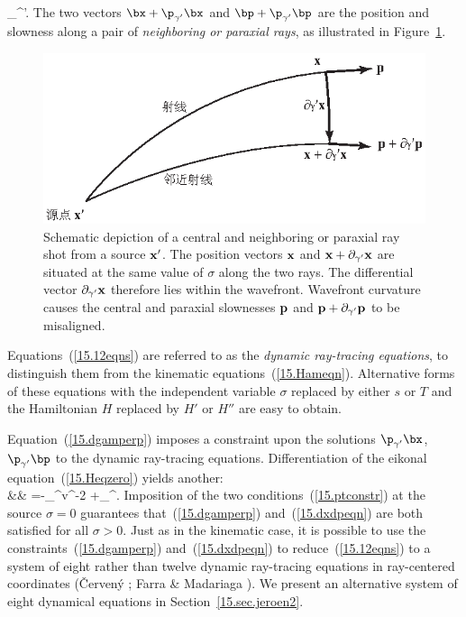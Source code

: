 \cdot\p_{\gamma^{\prime}}\bp'.
\en
The two vectors $\bx+\p_{\gamma^{\prime}}\bx$ and $\bp+\p_{\gamma^{\prime}}\bp$
are the position and slowness along a pair of {\em neighboring or paraxial
rays\/},
%
%
as illustrated in Figure~\ref{15.fig.neighbor}.
\begin{figure}
\begin{center}
\includegraphics{../figures/chap15/fig02.eps}
\end{center}
\caption[paraxial ray]
{\label{15.fig.neighbor}
Schematic depiction of a central and neighboring or paraxial ray
shot from a source ${\bf x}'$.  The position vectors ${\bf x}$
and ${\bf x}+\partial_{\gamma'}{\bf x}$ are situated at the
same value of $\sigma$ along the two rays.  The differential
vector $\partial_{\gamma'}{\bf x}$ therefore lies within the
wavefront.  Wavefront curvature causes the central and paraxial
slownesses ${\bf p}$ and ${\bf p}+\partial_{\gamma'}{\bf p}$ to
be misaligned.}
\end{figure}
Equations~(\ref{15.12eqns}) are referred to as the
{\em dynamic ray-tracing equations\/}, to distinguish
%
them from the kinematic equations~(\ref{15.Hameqn}).
Alternative forms of these equations with the
independent variable $\sigma$ replaced by either $s$ or $T$ and the
Hamiltonian $H$ replaced by $H'$ or $H''$ are easy to obtain.

Equation~(\ref{15.dgamperp}) imposes a constraint upon the solutions
$\p_{\gamma^{\prime}}\bx$, $\p_{\gamma^{\prime}}\bp$ to the dynamic
ray-tracing equations.  Differentiation of the eikonal
equation~(\ref{15.Heqzero}) yields another:
\eqa \label{15.dxdpeqn}  \nonumber \\
&&\mbox{}\hspace{1.0 mm}
=-\half\p_{\gamma^{\prime}}\bx\cdot\bdel v^{-2}
+\p_{\gamma^{\prime}}\bp\cdot{}.
\ena
Imposition of the two conditions~(\ref{15.ptconstr})
at the source $\sigma=0$ guarantees that~(\ref{15.dgamperp})
and~(\ref{15.dxdpeqn}) are both satisfied for all $\sigma>0$.
Just as in the kinematic case,
it is possible to use the constraints~(\ref{15.dgamperp})
and~(\ref{15.dxdpeqn}) to reduce~(\ref{15.12eqns}) to a
system of eight rather than twelve dynamic ray-tracing
equations in ray-centered coordinates (\v{C}erven\'{y}
\citeyear{cerveny85}; Farra \& Madariaga \citeyear{farra&madariaga87}).
We present an alternative system of eight dynamical equations in
Section~\ref{15.sec.jeroen2}.
%
%
%

